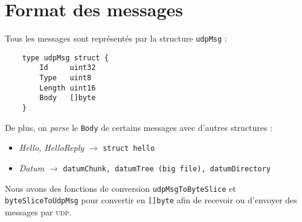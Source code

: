 \section{Format des messages}
Tous les messages sont représentés par la structure \texttt{udpMsg} :
\begin{verbatim}
    type udpMsg struct {
        Id     uint32
        Type   uint8
        Length uint16
        Body   []byte
    }  
\end{verbatim}
\newpage
De plus, on \textit{parse} le \texttt{Body} de certains messages avec d'autres structures :
\begin{itemize}
    \item \textit{Hello, HelloReply} $\rightarrow$ \texttt{struct hello}
    \item \textit{Datum} $\rightarrow$ \texttt{datumChunk, datumTree (big file), datumDirectory}
\end{itemize}
Nous avons des fonctions de conversion \texttt{udpMsgToByteSlice} et \texttt{byteSliceToUdpMsg} pour convertir en \texttt{[]byte} afin de recevoir ou d'envoyer des messages par \textsc{udp}.


